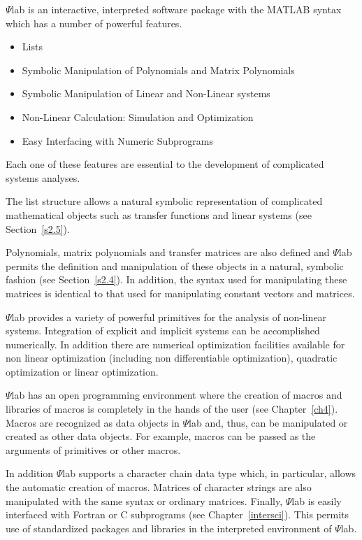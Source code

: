 $\Psi$lab is an interactive, interpreted software package with 
the MATLAB syntax which has a number of powerful features.  
%
\begin{itemize}
	\item Lists
	\item Symbolic Manipulation of Polynomials and Matrix Polynomials
        \item Symbolic Manipulation of Linear and Non-Linear systems
	\item Non-Linear Calculation: Simulation and Optimization
	\item Easy Interfacing with Numeric Subprograms
\end{itemize}
%
Each one of these features are essential to the development 
of complicated systems analyses.

 The list structure allows a natural symbolic representation of complicated
mathematical objects such as transfer functions and linear systems
(see Section~\ref{s2.5}).

	Polynomials, matrix polynomials and transfer matrices 
are also defined and 
$\Psi$lab permits the definition and manipulation of these objects in a
natural, symbolic fashion (see Section~\ref{s2.4}).  In addition,
the syntax used for manipulating these matrices
is identical to that used for manipulating constant vectors and matrices.

	$\Psi$lab provides a variety of powerful primitives for
the analysis of non-linear systems.  
Integration of explicit and implicit systems can be accomplished 
numerically.  In addition there are numerical optimization 
facilities available for non linear optimization (including
non differentiable optimization), quadratic optimization or 
linear optimization.

	$\Psi$lab has an open programming environment where the
creation of macros and libraries of macros is completely in the
hands of the user (see Chapter~\ref{ch4}).    
Macros are recognized as data objects in $\Psi$lab and, thus, can be 
manipulated or created as other data objects.  For example, macros
can be passed as the arguments of primitives or other macros.

In addition $\Psi$lab supports a character chain data type 
which, in particular, allows the automatic creation of macros.
Matrices of character strings are also manipulated with the same
syntax or ordinary matrices.
	Finally, $\Psi$lab is easily interfaced with Fortran or C 
subprograms (see Chapter~\ref{intersci}).  This permits use of standardized 
packages and libraries in the interpreted environment of $\Psi$lab.

